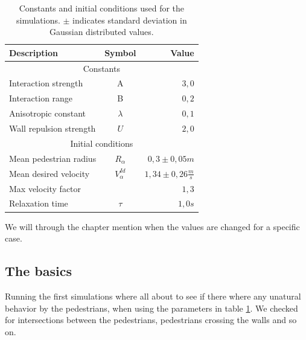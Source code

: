 \begin{table}[ht]
    \begin{center}
        \begin{tabular}{l c r}
            \toprule
            \textbf{Description} & \textbf{Symbol} & \textbf{Value} \\
            \midrule
            \multicolumn{3}{c}{\textsf{Constants}}\\
            Interaction strength & A & $3,0$ \\
            Interaction range & B & $0,2$ \\
            Anisotropic constant & $\lambda$ & $0,1$ \\
            Wall repulsion strength & $U$ &  $2,0$ \\
            \midrule
            \multicolumn{3}{c}{\textsf{Initial conditions}}\\
            Mean pedestrian radius & $R_\alpha$ & $0,3 \pm 0,05 m$\\
            Mean desired velocity &  $V^{Id}_\alpha$ &  $1,34 \pm 0,26 
            \frac{m}{s}$ \\
            Max velocity factor &  &  $1,3$ \\
            Relaxation time & $\tau$ & $1,0 s$\\
            \bottomrule
        \end{tabular}
        \caption[Constants and initial conditions]{Constants and initial 
        conditions used for the simulations. $\pm$ indicates standard 
        deviation in Gaussian distributed values.}
        \label{tbl:parameter-settings}
    \end{center}
\end{table}

We will through the chapter mention when the values are changed for a specific case.  

\subsection{The basics}
Running the first simulations where all about to see if there where any 
unatural behavior by the pedestrians, when using the parameters in table 
\ref{tbl:parameter-settings}. We checked for intersections between the pedestrians, 
pedestrians crossing the walls and so on.

